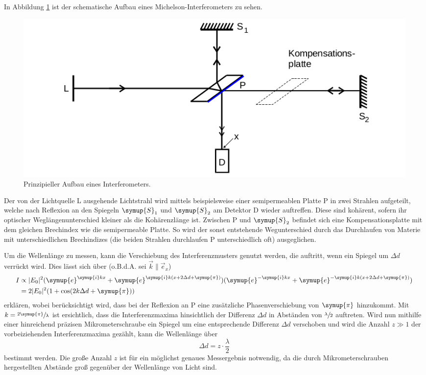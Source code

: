 In Abbildung \ref{fig:Aufbau_Interf} ist der schematische Aufbau eines Michelson-Interferometers zu sehen. 
\begin{figure}
    \centering
    \includegraphics[width=\textwidth]{plots/Aufbau_Interf.png}
    \caption{Prinzipieller Aufbau eines Interferometers\cite{Versuchsanleitung}.}
    \label{fig:Aufbau_Interf}
\end{figure}
Der von der Lichtquelle L ausgehende Lichtstrahl wird mittels beispielsweise einer semipermeablen Platte P in zwei Strahlen aufgeteilt, 
welche nach Reflexion an den Spiegeln $\symup{S}_1$ und $\symup{S}_2$ am Detektor D wieder auftreffen. 
Diese sind kohärent, sofern ihr optischer Weglängenunterschied kleiner als die Kohärenzlänge ist. 
Zwischen P und $\symup{S}_2$ befindet sich eine Kompensationsplatte mit dem gleichen Brechindex wie die semipermeable Platte.
So wird der sonst entstehende Wegunterschied durch das Durchlaufen von Materie mit unterschiedlichen Brechindizes (die beiden 
Strahlen durchlaufen P unterschiedlich oft) ausgeglichen. 

Um die Wellenlänge zu messen, kann die Verschiebung des Interferenzmusters genutzt werden, die auftritt, wenn ein Spiegel um $\Delta d$ verrückt wird. 
Dies lässt sich über (o.B.d.A. sei $\vec{k} \parallel \vec{e}_x$) 
\begin{align*}
    I &\propto |E_0|^2 (\symup{e}^{\symup{i}kx}+\symup{e}^{\symup{i}k(x+2\Delta d + \symup{\pi})})(\symup{e}^{-\symup{i}kx}+\symup{e}^{-\symup{i}k(x+2\Delta d + \symup{\pi})}) \\
      &= 2|E_0|^2(1+\cos (2k \Delta d + \symup{\pi}))
\end{align*}
erklären, wobei berücksichtigt wird, dass bei der Reflexion an P eine zusätzliche Phasenverschiebung von $\symup{\pi}$ hinzukommt. 
Mit $k=\sfrac{2\symup{\pi}}{\lambda}$ ist ersichtlich, dass die Interferenzmaxima hinsichtlich der Differenz $\Delta d$ in Abständen von $\sfrac{\lambda}{2}$ auftreten\cite{Versuchsanleitung}. 
Wird nun mithilfe einer hinreichend präzisen Mikrometerschraube ein Spiegel um eine entsprechende Differenz $\Delta d$
verschoben und wird die Anzahl $z\gg 1$ der vorbeiziehenden Interferenzmaxima gezählt, kann die Wellenlänge über 
\begin{equation*}
    \Delta d=z \cdot \frac{\lambda}{2}
\end{equation*}
bestimmt werden. Die große Anzahl $z$ ist für ein möglichst genaues Messergebnis notwendig, da die durch Mikrometerschrauben hergestellten Abstände groß gegenüber 
der Wellenlänge von Licht sind.

